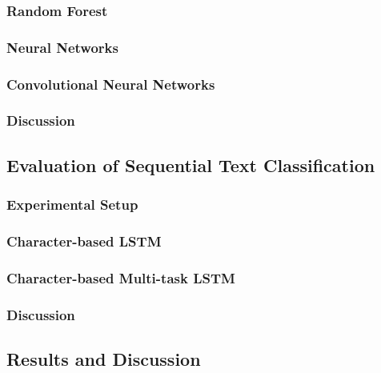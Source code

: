 \subsubsection{Random Forest}
\subsubsection{Neural Networks}
\subsubsection{Convolutional Neural Networks}


\subsubsection{Discussion}


\subsection{Evaluation of Sequential Text Classification}


\subsubsection{Experimental Setup}

\subsubsection{Character-based LSTM}

\subsubsection{Character-based Multi-task LSTM}

\subsubsection{Discussion}

\subsection{Results and Discussion}
